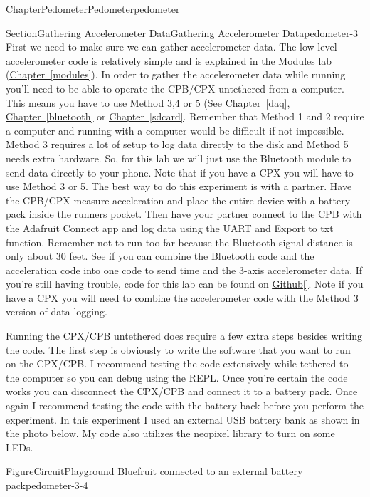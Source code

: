 \documentclass[oneside,10pt,]{book}
\newcommand{\xreffont}{\relax}
\newcommand{\linkhilite}[1]{\underline{#1}}
\numberwithin{equation}{section}
\begin{document}
\begin{chapterptx}{Chapter}{Pedometer}{}{Pedometer}{}{}{pedometer}
\begin{sectionptx}{Section}{Gathering Accelerometer Data}{}{Gathering Accelerometer Data}{}{}{pedometer-3}
First we need to make sure we can gather accelerometer data. The low level accelerometer code is relatively simple and is explained in the Modules lab (\hyperref[modules]{\linkhilite{Chapter~{\xreffont\ref{modules}}}}). In order to gather the accelerometer data while running you'll need to be able to operate the CPB\slash{}CPX untethered from a computer. This means you have to use Method 3,4 or 5 (See \hyperref[daq]{\linkhilite{Chapter~{\xreffont\ref{daq}}}}, \hyperref[bluetooth]{\linkhilite{Chapter~{\xreffont\ref{bluetooth}}}} or \hyperref[sdcard]{\linkhilite{Chapter~{\xreffont\ref{sdcard}}}}. Remember that Method 1 and 2 require a computer and running with a computer would be difficult if not impossible. Method 3 requires a lot of setup to log data directly to the disk and Method 5 needs extra hardware. So, for this lab we will just use the Bluetooth module to send data directly to your phone. Note that if you have a CPX you will have to use Method 3 or 5. The best way to do this experiment is with a partner. Have the CPB\slash{}CPX measure acceleration and place the entire device with a battery pack inside the runners pocket. Then have your partner connect to the CPB with the Adafruit Connect app and log data using the UART and Export to txt function. Remember not to run too far because the Bluetooth signal distance is only about 30 feet. See if you can combine the Bluetooth code and the acceleration code into one code to send time and the 3-axis accelerometer data. If you're still having trouble, code for this lab can be found on \href{https://github.com/cmontalvo251/Microcontrollers/tree/master/Circuit_Playground/CircuitPython/pedometer}{\linkhilite{Github}}\hyperlink{Github}{\linkhilite{[{\xreffont 33}]}}. Note if you have a CPX you will need to combine the accelerometer code with the Method 3 version of data logging.%
\par
Running the CPX\slash{}CPB untethered does require a few extra steps besides writing the code. The first step is obviously to write the software that you want to run on the CPX\slash{}CPB. I recommend testing the code extensively while tethered to the computer so you can debug using the REPL. Once you're certain the code works you can disconnect the CPX\slash{}CPB and connect it to a battery pack. Once again I recommend testing the code with the battery back before you perform the experiment. In this experiment I used an external USB battery bank as shown in the photo below. My code also utilizes the neopixel library to turn on some LEDs.%
\begin{figureptx}{Figure}{CircuitPlayground Bluefruit connected to an external battery pack}{pedometer-3-4}{}%

\end{figureptx}
\end{sectionptx}
\end{chapterptx}
\end{document}
